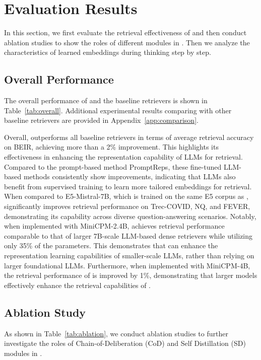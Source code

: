 \section{Evaluation Results}
In this section, we first evaluate the retrieval effectiveness of
\method{} and then conduct ablation studies to show the roles of different modules in \method{}. Then we analyze the characteristics of learned embeddings during thinking step by step.




\subsection{Overall Performance}
The overall performance of \method{} and the baseline retrievers is shown in Table~\ref{tab:overall}. Additional experimental results comparing \method{} with other baseline retrievers are provided in Appendix~\ref{app:comparison}.

Overall, \method{} outperforms all baseline retrievers in terms of average retrieval accuracy on BEIR, achieving more than a 2\% improvement. This highlights its effectiveness in enhancing the representation capability of LLMs for retrieval. Compared to the prompt-based method PromptReps, these fine-tuned LLM-based methods consistently show improvements, indicating that LLMs also benefit from supervised training to learn more tailored embeddings for retrieval.
When compared to E5-Mistral-7B, which is trained on the same E5 corpus as \method{}, \method{} significantly improves retrieval performance on Trec-COVID, NQ, and FEVER, demonstrating its capability across diverse question-answering scenarios.
Notably, when implemented with MiniCPM-2.4B, \method{} achieves retrieval performance comparable to that of larger 7B-scale LLM-based dense retrievers while utilizing only 35\% of the parameters. This demonstrates that \method{} can enhance the representation learning capabilities of smaller-scale LLMs, rather than relying on larger foundational LLMs. 
Furthermore, when implemented with MiniCPM-4B,  the retrieval performance of \method{} is improved by 1\%,  demonstrating that larger models effectively enhance the retrieval capabilities of \method{}.


\subsection{Ablation Study}

As shown in Table~\ref{tab:ablation}, we conduct ablation studies to further investigate the roles of Chain-of-Deliberation (CoD) and Self Distillation (SD) modules in \method{}.


